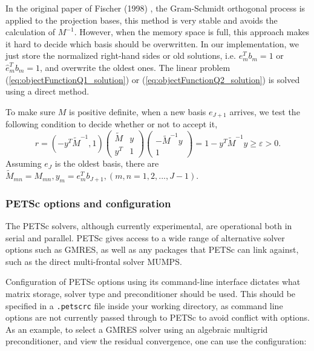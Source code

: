 In the original paper of Fischer (1998) \cite{FISCHER1998193}, the Gram-Schmidt orthogonal process is applied to the projection bases, this method is very stable and avoids the calculation of $M^{-1}$. However, when the memory space is full, this approach makes it hard to decide which basis should be overwritten. In our implementation, we just store the normalized right-hand sides or old solutions, i.e. $e_m^T b_m=1$ or $\hat{e}_m^T b_m=1$, and overwrite the oldest ones. The linear problem (\ref{eq:objectFunctionQ1_solution}) or (\ref{eq:objectFunctionQ2_solution}) is solved using a direct method.

To make sure $M$ is positive definite, when a new basis $e_{J+1}$ arrives, we test the following condition to decide whether or not to accept it,
\begin{equation}\label{eq:thredhold}
r = (-y^T\tilde{M} ^{-1}, 1) \begin{pmatrix}
\tilde{M}     & y\\
y^T  & 1
\end{pmatrix}
\begin{pmatrix}
-\tilde{M} ^{-1}y\\
1
\end{pmatrix} =1 - y^T\tilde{M}^{-1}y \ge \varepsilon > 0.
\end{equation}
Assuming $e_J$ is the oldest basis, there are $\tilde{M}_{mn} = M_{mn}, y_m = e_{m}^Tb_{J+1}, (m, n=1, 2, ..., J-1)$.

\subsubsection{PETSc options and configuration}
\label{sec:petsc}

The PETSc solvers, although currently experimental, are operational both in
serial and parallel. PETSc gives access to a wide range of alternative solver
options such as GMRES, as well as any packages that PETSc can link against, such
as the direct multi-frontal solver MUMPS.

Configuration of PETSc options using its command-line interface dictates what
matrix storage, solver type and preconditioner should be used. This should be
specified in a \texttt{.petscrc} file inside your working directory, as command
line options are not currently passed through to PETSc to avoid conflict with
\nekpp options. As an example, to select a GMRES solver using an algebraic
multigrid preconditioner, and view the residual convergence, one can use the
configuration:


